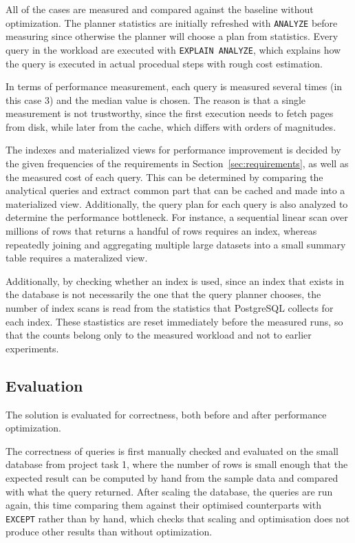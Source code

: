 \documentclass[a4paper]{scrartcl}
\renewcommand{\_}{\textunderscore\allowbreak}
\begin{document}
All of the cases are measured and compared against the baseline without optimization. The planner statistics are initially refreshed with \texttt{ANALYZE} before measuring since otherwise the planner will choose a plan from statistics. Every query in the workload are executed with \texttt{EXPLAIN ANALYZE}, which explains how the query is executed in actual procedual steps with rough cost estimation.

In terms of performance measurement, each query is measured several times (in this case 3) and the median value is chosen. The reason is that a single measurement is not trustworthy, since the first execution needs to fetch pages from disk, while later from the cache, which differs with orders of magnitudes.

The indexes and materialized views for performance improvement is decided by the given frequencies of the requirements in Section~\ref{sec:requirements}, as well as the measured cost of each query. This can be determined by comparing the analytical queries and extract common part that can be cached and made into a materialized view. Additionally, the query plan for each query is also analyzed to determine the performance bottleneck. For instance, a sequential linear scan over millions of rows that returns a handful of rows requires an index, whereas repeatedly joining and aggregating multiple large datasets into a small summary table requires a materalized view.

Additionally, by checking whether an index is used, since an index that exists in the database is not necessarily the one that the query planner chooses, the number of index scans is read from the statistics that PostgreSQL collects for each index. These stastistics are reset immediately before the measured runs, so that the counts belong only to the measured workload and not to earlier experiments.

\subsection{Evaluation}

The solution is evaluated for correctness, both before and after performance optimization.

The correctness of queries is first manually checked and evaluated on the small database from project task 1, where the number of rows is small enough that the expected result can be computed by hand from the sample data and compared with what the query returned. After scaling the database, the queries are run again, this time comparing them against their optimised counterparts with \texttt{EXCEPT} rather than by hand, which checks that scaling and optimisation does not produce other results than without optimization.
\end{document}
